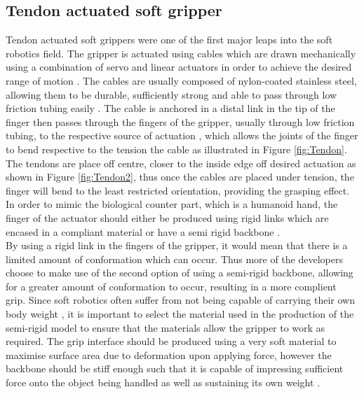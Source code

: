 \documentclass[11pt]{article}
\begin{document}
\subsection{Tendon actuated soft gripper}
Tendon actuated soft grippers were one of the first major leaps into the soft robotics field. The gripper is actuated using cables which are drawn mechanically using a combination of servo and linear actuators in order to achieve the desired range of motion \cite{marchese2015recipe}. The cables are usually composed of nylon-coated stainless steel, allowing them to be durable, sufficiently strong and able to pass through low friction tubing easily \cite{dollar2010contact}. The cable is anchored in a distal link in the tip of the finger then passes through the fingers of the gripper, usually through low friction tubing, to the respective source of actuation \cite{dollar2010contact}, which allows the joints of the finger to bend respective to the tension the cable as illustrated in Figure \ref{fig:Tendon}. The tendons are place off centre, closer to the inside edge off desired actuation as shown in Figure \ref{fig:Tendon2}, thus once the cables are placed under tension, the finger will bend to the least restricted orientation, providing the grasping effect. In order to mimic the biological counter part, which is a humanoid hand, the finger of the actuator should either be produced using rigid links which are encased in a compliant material or have a semi rigid backbone \cite{mutlu2016mechanical}. 
\\
\newline
By using a rigid link in the fingers of the gripper, it would mean that there is a limited amount of conformation which can occur. Thus more of the developers choose to make use of the second option of using a semi-rigid backbone, allowing for a greater amount of conformation to occur, resulting in a more complient grip. Since soft robotics often suffer from not being capable of carrying their own body weight \cite{mutlu2016mechanical}, it is important to select the material used in the production of the semi-rigid model to ensure that the materials allow the gripper to work as required. The grip interface should be produced using a very soft material to maximise surface area due to deformation upon applying force, however the backbone should be stiff enough such that it is capable of impressing sufficient force onto the object being handled as well as sustaining its own weight \cite{hassan2015design}.  
\\
\newline
\end{document}
